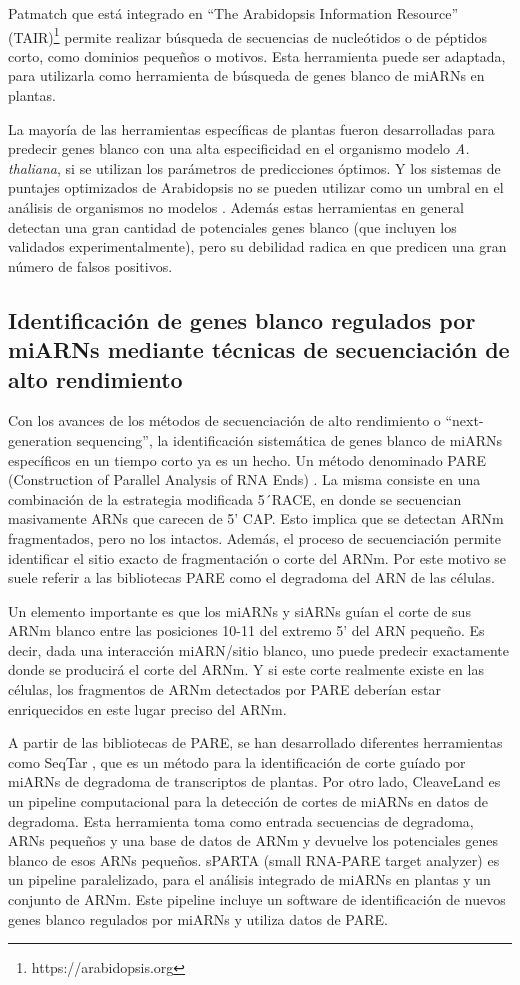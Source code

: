 Patmatch \citep{Yan01072005} que está integrado en ``The Arabidopsis Information Resource'' (TAIR)\footnote{https://arabidopsis.org} permite realizar búsqueda de secuencias de nucleótidos o de péptidos corto, como dominios pequeños o motivos.
Esta herramienta puede ser adaptada, para utilizarla como herramienta de búsqueda de genes blanco de miARNs en plantas.

La mayoría de las herramientas específicas de plantas fueron desarrolladas para predecir genes blanco con una alta especificidad en el organismo modelo \textit{A. thaliana}, si se utilizan los parámetros de predicciones óptimos.
Y los sistemas de puntajes optimizados de Arabidopsis no se pueden utilizar como un umbral en el análisis de organismos no modelos \citep{pmid24885295}.
Además estas herramientas en general detectan una gran cantidad de potenciales genes blanco (que incluyen los validados experimentalmente), pero su debilidad radica en que predicen una gran número de falsos positivos.

\subsection{Identificación de genes blanco regulados por miARNs mediante técnicas de secuenciación de alto rendimiento}
Con los avances de los métodos de secuenciación de alto rendimiento o ``next-generation sequencing'', la identificación sistemática de genes blanco de miARNs específicos en un tiempo corto ya es un hecho.
Un método denominado PARE (Construction of Parallel Analysis of RNA Ends) \citep{pmid19247285}.
La misma consiste en una combinación de la estrategia modificada 5´RACE, en donde se secuencian masivamente ARNs que carecen de 5’ CAP.
Esto implica que se detectan ARNm fragmentados, pero no los intactos.
Además, el proceso de secuenciación permite identificar el sitio exacto de fragmentación o corte del ARNm.
Por este motivo se suele referir a las bibliotecas PARE como el degradoma del ARN de las células. 

Un elemento importante es que los miARNs y siARNs guían el corte de sus ARNm blanco entre las posiciones 10-11 del extremo 5' del ARN pequeño.
Es decir, dada una interacción miARN/sitio blanco, uno puede predecir exactamente donde se producirá el corte del ARNm.
Y si este corte realmente existe en las células, los fragmentos de ARNm detectados por PARE deberían estar enriquecidos en este lugar preciso del ARNm.

A partir de las bibliotecas de PARE, se han desarrollado diferentes herramientas como SeqTar \citep{pmid22140118}, que es un método para la identificación de corte guíado por miARNs de degradoma de transcriptos de plantas.
Por otro lado, CleaveLand \citep{pmid19017659} es un pipeline computacional para la detección de cortes de miARNs en datos de degradoma.
Esta herramienta toma como entrada secuencias de degradoma, ARNs pequeños y una base de datos de ARNm y devuelve los potenciales genes blanco de esos ARNs pequeños. 
sPARTA (small RNA-PARE target analyzer) \citep{pmid25120269} es un pipeline paralelizado, para el análisis integrado de miARNs en plantas y un conjunto de ARNm.
Este pipeline incluye un software de identificación de nuevos genes blanco regulados por miARNs y utiliza datos de PARE.

